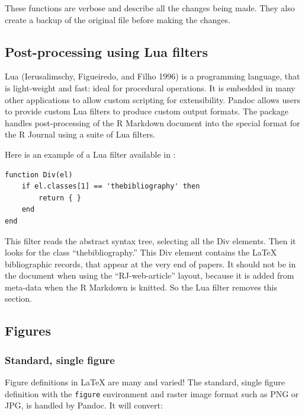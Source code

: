 These functions are verbose and describe all the changes being made. They also create a backup of the original file before making the changes.

\hypertarget{post-processing-using-lua-filters}{%
\subsection{Post-processing using Lua filters}\label{post-processing-using-lua-filters}}

Lua (Ierusalimschy, Figueiredo, and Filho 1996) is a programming language, that is light-weight and fast: ideal for procedural operations. It is embedded in many other applications to allow custom scripting for extensibility. Pandoc allows users to provide custom Lua filters to produce custom output formats. The  package handles post-processing of the R Markdown document into the special format for the R Journal using a suite of Lua filters.

Here is an example of a Lua filter available in :

\begin{verbatim}
function Div(el)
    if el.classes[1] == 'thebibliography' then
        return { }
    end
end
\end{verbatim}

This filter reads the abstract syntax tree, selecting all the Div elements. Then it looks for the class ``thebibliography.'' This Div element contains the LaTeX bibliographic records, that appear at the very end of papers. It should not be in the document when using the ``RJ-web-article'' layout, because it is added from meta-data when the R Markdown is knitted. So the Lua filter removes this section.

\hypertarget{figures}{%
\subsection{Figures}\label{figures}}

\hypertarget{standard-single-figure}{%
\subsubsection{Standard, single figure}\label{standard-single-figure}}

Figure definitions in LaTeX are many and varied! The standard, single figure definition with the \texttt{figure} environment and raster image format such as PNG or JPG, is handled by Pandoc. It will convert:

